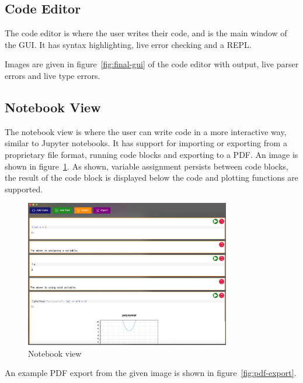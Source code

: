 \subsection{Code Editor}\label{subsec:code-editor}

The code editor is where the user writes their code, and is the main window of the GUI\@.
It has syntax highlighting, live error checking and a REPL\@.

Images are given in figure~\ref{fig:final-gui} of the code editor with output, live parser errors and live type errors.

\subsection{Notebook View}\label{subsec:notebook-view}

The notebook view is where the user can write code in a more interactive way, similar to Jupyter notebooks\citep{Jupyter}.
It has support for importing or exporting from a proprietary file format, running code blocks and exporting to a PDF\@.
An image is shown in figure~\ref{fig:notebook-view}.
As shown, variable assignment persists between code blocks, the result of the code block is displayed below the code
and plotting functions are supported.

\begin{figure}[H]
    \centering 
    \includegraphics[width=0.8\textwidth]{assets/finalNotebook}
    \caption{Notebook view}\label{fig:notebook-view}
\end{figure}

An example PDF export from the given image is shown in figure~\ref{fig:pdf-export}.

